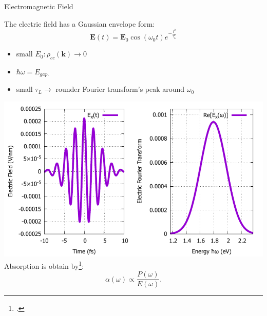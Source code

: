 \documentclass{beamer}
\begin{document}
	\begin{frame}{Electromagnetic Field}
	\begin{multicols}{2}
The electric field has a Gaussian envelope form:
\begin{equation}
	\textbf{E}(t) = \textbf{E}_0 \cos(\omega_0 t)e^{-\frac{t^2}{\tau_L^2}}
\end{equation}
\begin{itemize}
	\item small $E_0: \rho_{cc}(\textbf{k}) \to 0$
	\item $\hbar \omega = E_{gap.}$
	\item small $\tau_L \to $ rounder Fourier transform's peak around $\omega_0$
\end{itemize}
\columnbreak
\includegraphics[width=1\linewidth]{images/Eat.pdf}
Absorption is obtain by\footcite{haug_quantum_2009}:
\begin{equation}
	\alpha(\omega) \propto \frac{P(\omega)}{E(\omega)}.
\end{equation}
	\end{multicols}
	\end{frame}
\end{document}
